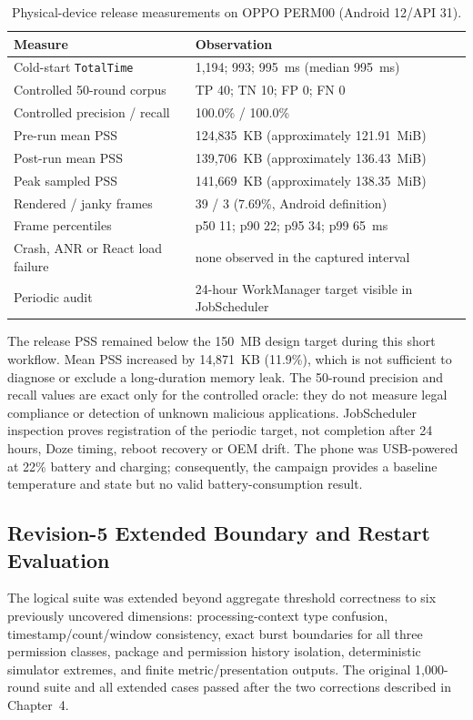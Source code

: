 \begin{table}[H]
\centering
\caption{Physical-device release measurements on OPPO PERM00 (Android 12/API 31).}
\label{tab:oppo-physical}
\begin{tabular}{@{}ll@{}}
\toprule
Measure & Observation \\
\midrule
Cold-start \texttt{TotalTime} & 1,194; 993; 995~ms (median 995~ms) \\
Controlled 50-round corpus & TP 40; TN 10; FP 0; FN 0 \\
Controlled precision / recall & 100.0\% / 100.0\% \\
Pre-run mean PSS & 124,835~KB (approximately 121.91~MiB) \\
Post-run mean PSS & 139,706~KB (approximately 136.43~MiB) \\
Peak sampled PSS & 141,669~KB (approximately 138.35~MiB) \\
Rendered / janky frames & 39 / 3 (7.69\%, Android definition) \\
Frame percentiles & p50 11; p90 22; p95 34; p99 65~ms \\
Crash, ANR or React load failure & none observed in the captured interval \\
Periodic audit & 24-hour WorkManager target visible in JobScheduler \\
\bottomrule
\end{tabular}
\end{table}

The release PSS remained below the 150~MB design target during this short workflow. Mean PSS increased by 14,871~KB (11.9\%), which is not sufficient to diagnose or exclude a long-duration memory leak. The 50-round precision and recall values are exact only for the controlled oracle: they do not measure legal compliance or detection of unknown malicious applications. JobScheduler inspection proves registration of the periodic target, not completion after 24 hours, Doze timing, reboot recovery or OEM drift. The phone was USB-powered at 22\% battery and charging; consequently, the campaign provides a baseline temperature and state but no valid battery-consumption result.
\subsection{Revision-5 Extended Boundary and Restart Evaluation}

The logical suite was extended beyond aggregate threshold correctness to six previously uncovered dimensions: processing-context type confusion, timestamp/count/window consistency, exact burst boundaries for all three permission classes, package and permission history isolation, deterministic simulator extremes, and finite metric/presentation outputs. The original 1,000-round suite and all extended cases passed after the two corrections described in Chapter~4.

